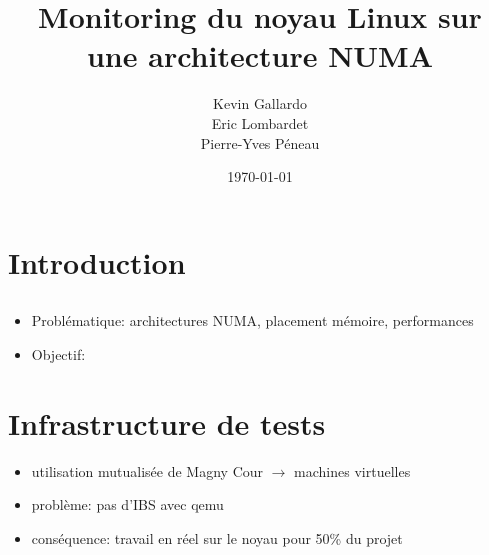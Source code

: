 \documentclass{beamer}
\title{Monitoring du noyau Linux sur une architecture NUMA}
\author[]{Kevin Gallardo\\Eric Lombardet\\Pierre-Yves Péneau}
\date{\today} \institute[UPMC]{Pierre and Marie Curie College}
\newcommand{\bframe}{\begin{frame}{\secname}{\subsecname}}
\begin{document}
  \frame{\titlepage}

  \section{Introduction}
    \subsection{}

      \bframe

        \begin{itemize}
          \item Problématique:\newline \vspace{0.2cm}\hspace{0.4cm}
            architectures NUMA, placement mémoire, performances\newline
          \item<2> Objectif:\newline {}
        \end{itemize}

      \end{frame}

  \section{Infrastructure de tests}
    \bframe
      \begin{itemize}
        \item utilisation mutualisée de Magny Cour $\rightarrow$ machines
          virtuelles
        \item<2-3> problème: pas d'IBS avec qemu
        \item<3> conséquence: travail en réel sur le noyau pour 50\% du projet
      \end{itemize}
    \end{frame}
\end{document}
